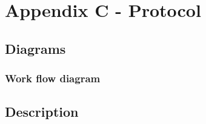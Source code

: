 \section{Appendix C - Protocol}


\subsection*{Diagrams}


\subsubsection*{Work flow diagram}

\subsection*{Description}

